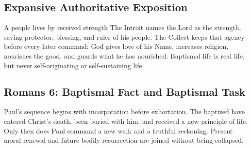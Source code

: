\begin{deepstudy}
\newpage
\section*{Expansive Authoritative Exposition}

\begin{massbox}{A people lives by received strength\enspace{}}
The Introit names the Lord as the strength, saving protector, blessing, and ruler of his people. The Collect keeps that agency before every later command: God gives love of his Name, increases religion, nourishes the good, and guards what he has nourished. Baptismal life is real life, but never self-originating or self-sustaining life.
\end{massbox}

\sectionguard
\subsection*{Romans 6: Baptismal Fact and Baptismal Task\enspace{}}

Paul's sequence begins with incorporation before exhortation. The baptized have entered Christ's death, been buried with him, and received a new principle of life. Only then does Paul command a new walk and a truthful reckoning. Present moral renewal and future bodily resurrection are joined without being collapsed.


\end{deepstudy}
